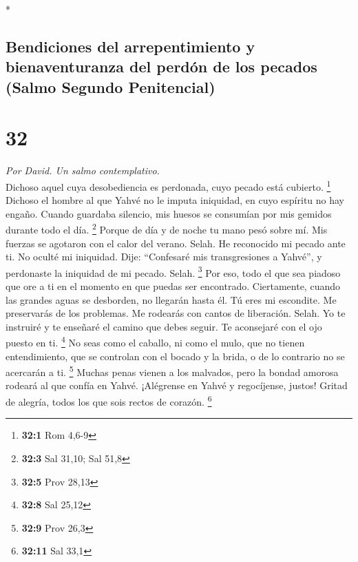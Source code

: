 \begin{paracol}{2}
\begin{otherlanguage}{english}
\end{otherlanguage}

\switchcolumn[0]*

\hypertarget{bendiciones-del-arrepentimiento-y-bienaventuranza-del-perduxf3n-de-los-pecados-salmo-segundo-penitencial}{%
\subsection{Bendiciones del arrepentimiento y bienaventuranza del perdón
de los pecados (Salmo Segundo
Penitencial)}\label{bendiciones-del-arrepentimiento-y-bienaventuranza-del-perduxf3n-de-los-pecados-salmo-segundo-penitencial}}

\hypertarget{section-62}{%
\section{32}\label{section-62}}

\emph{Por David. Un salmo contemplativo.}\\
 Dichoso aquel cuya desobediencia es perdonada, cuyo
pecado está cubierto. \footnote{\textbf{32:1} Rom 4,6-9} 
Dichoso el hombre al que Yahvé no le imputa iniquidad, en cuyo espíritu
no hay engaño.  Cuando guardaba silencio, mis huesos se
consumían por mis gemidos durante todo el día. \footnote{\textbf{32:3}
  Sal 31,10; Sal 51,8}  Porque de día y de noche tu mano
pesó sobre mí. Mis fuerzas se agotaron con el calor del verano. Selah.
 He reconocido mi pecado ante ti. No oculté mi iniquidad.
Dije: ``Confesaré mis transgresiones a Yahvé'', y perdonaste la
iniquidad de mi pecado. Selah. \footnote{\textbf{32:5} Prov 28,13}
 Por eso, todo el que sea piadoso que ore a ti en el
momento en que puedas ser encontrado. Ciertamente, cuando las grandes
aguas se desborden, no llegarán hasta él.  Tú eres mi
escondite. Me preservarás de los problemas. Me rodearás con cantos de
liberación. Selah.  Yo te instruiré y te enseñaré el
camino que debes seguir. Te aconsejaré con el ojo puesto en ti.
\footnote{\textbf{32:8} Sal 25,12}  No seas como el
caballo, ni como el mulo, que no tienen entendimiento, que se controlan
con el bocado y la brida, o de lo contrario no se acercarán a ti.
\footnote{\textbf{32:9} Prov 26,3}  Muchas penas vienen a
los malvados, pero la bondad amorosa rodeará al que confía en Yahvé.
 ¡Alégrense en Yahvé y regocíjense, justos! Gritad de
alegría, todos los que sois rectos de corazón. \footnote{\textbf{32:11}
  Sal 33,1}


\end{paracol}
